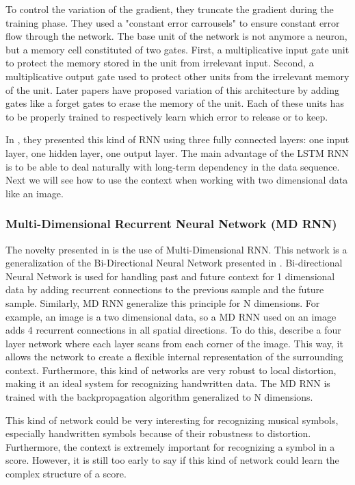 \documentclass[11pt]{sdm}
\begin{document}
To control the variation of the gradient, they truncate the gradient during the training phase.
They used a "constant error carrousels" to ensure constant error flow through the network.
The base unit of the network is not anymore a neuron, but a memory cell constituted of two gates.
First, a multiplicative input gate unit to protect the memory stored in the unit from irrelevant input.
Second, a multiplicative output gate used to protect other units from the irrelevant memory of the unit.
Later papers have proposed variation of this architecture by adding gates like a forget gates to erase the memory of the unit.
Each of these units has to be properly trained to respectively learn which error to release or to keep.

In \cite{hochreiter_long_1997}, they presented this kind of RNN using three fully connected layers: one input layer, one hidden layer, one output layer.
The main advantage of the LSTM RNN is to be able to deal naturally with long-term dependency in the data sequence.
Next we will see how to use the context when working with two dimensional data like an image.

\subsubsection{Multi-Dimensional Recurrent Neural Network (MD RNN)}

The novelty presented in \cite{graves_offline_2009} is the use of Multi-Dimensional RNN.
This network is a generalization of the Bi-Directional Neural Network presented in \cite{schuster_bidirectional_1997}.
Bi-directional Neural Network is used for handling past and future context for 1 dimensional data by adding recurrent connections to the previous sample and the future sample.
Similarly, MD RNN generalize this principle for N dimensions.
For example, an image is a two dimensional data, so a MD RNN used on an image adds 4 recurrent connections in all spatial directions.
To do this, \cite{graves_offline_2009} describe a four layer network where each layer scans from each corner of the image.
This way, it allows the network to create a flexible internal representation of the surrounding context.
Furthermore, this kind of networks are very robust to local distortion, making it an ideal system for recognizing handwritten data.
The MD RNN is trained with the backpropagation algorithm generalized to N dimensions.

This kind of network could be very interesting for recognizing musical symbols, especially handwritten symbols because of their robustness to distortion.
Furthermore, the context is extremely important for recognizing a symbol in a score.
However, it is still too early to say if this kind of network could learn the complex structure of a score.
\end{document}
